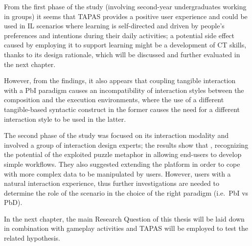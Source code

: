 From the first phase of the study (involving second-year undergraduates working in groups) it seems that \ac{TAPAS} provides a positive user experience and could be used in \ac{IL} scenarios where learning is self-directed and driven by people's preferences and intentions during their daily activities; a potential side effect caused by employing it to support learning might be a development of \ac{CT} skills, thanks to its design rationale, which will be discussed and further evaluated in the next chapter.

However, from the findings, it also appears that coupling tangible interaction with a \ac{PbI} paradigm causes an incompatibility of interaction styles between the composition and the execution environments, where the use of a different tangible-based syntactic construct in the former causes the need for a different interaction style to be used in the latter.

The second phase of the study was focused on its interaction modality and involved a group of interaction design experts; the results show that , recognizing the potential of the exploited puzzle metaphor in allowing end-users to develop simple workflows. They also suggested extending the platform in order to cope with more complex data to be manipulated by users. However,  users with a natural interaction experience, thus further investigations are needed to determine the role of the scenario in the choice of the right paradigm (i.e.\ \ac{PbI} vs \ac{PbD}).

In the next chapter, the main Research Question of this thesis will be laid down in combination with gameplay activities and \ac{TAPAS} will be employed to test the related hypothesis.